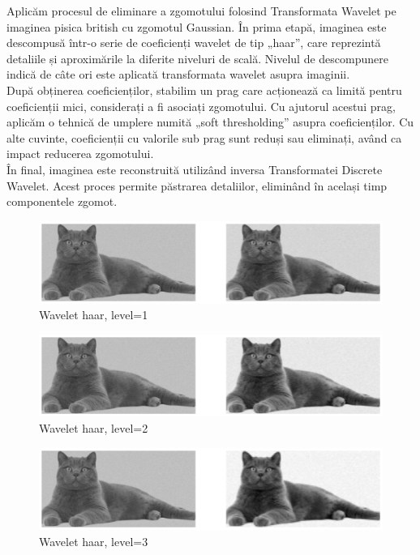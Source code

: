 \documentclass[12pt]{article}
\begin{document}
Aplicăm procesul de eliminare a zgomotului folosind Transformata Wavelet pe imaginea pisica british cu zgomotul Gaussian. În prima etapă, imaginea este descompusă într-o serie de coeficienți wavelet de tip „haar”, care reprezintă detaliile și aproximările la diferite niveluri de scală. Nivelul de descompunere indică de câte ori este aplicată transformata wavelet asupra imaginii. \\
\indent După obținerea coeficienților, stabilim un prag care acționează ca limită pentru coeficienții mici, considerați a fi asociați zgomotului. Cu ajutorul acestui prag, aplicăm o tehnică de umplere numită „soft thresholding” asupra coeficienților. Cu alte cuvinte, coeficienții cu valorile sub prag sunt reduși sau eliminați, având ca impact reducerea zgomotului. \\
\indent În final, imaginea este reconstruită utilizând inversa Transformatei Discrete Wavelet. Acest proces permite păstrarea detaliilor, eliminând în același timp componentele zgomot.


\begin{figure}[h!]
    \centering
    \includegraphics[width=1\textwidth]{images/dwt_img1.eps}
    \caption{Wavelet haar, level=1}
    \label{fig:dwt_img1}
\end{figure}
\begin{figure}[h!]
    \centering
    \includegraphics[width=1\textwidth]{images/dwt_img2.eps}
    \caption{Wavelet haar, level=2}
    \label{fig:dwt_img2}
\end{figure}

\begin{figure}[h!]
    \centering
    \includegraphics[width=1\textwidth]{images/dwt_img3.eps}
    \caption{Wavelet haar, level=3}
    \label{fig:dwt_img3}
\end{figure}
\end{document}
